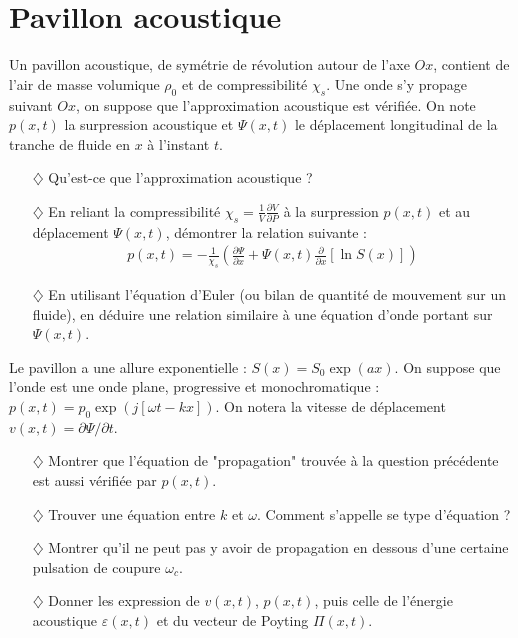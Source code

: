 \documentclass{report}
\begin{document}
\newpage

\section*{Pavillon acoustique}

Un pavillon acoustique, de symétrie de révolution autour de l'axe $Ox$, contient de l'air de masse volumique $\rho_0$ et de compressibilité $\chi_s$. Une onde s'y propage suivant $Ox$, on suppose que l'approximation acoustique est vérifiée. On note $p(x,t)$ la surpression acoustique et $\Psi(x,t)$ le déplacement longitudinal de la tranche de fluide en $x$ à l'instant $t$. 

\begin{itemize}

\item[$\diamondsuit$] Qu'est-ce que l'approximation acoustique ?

\item[$\diamondsuit$] En reliant la compressibilité $\chi_s=\frac{1}{V}\frac{\partial V}{\partial P}$ à la surpression $p(x,t)$ et au déplacement $\Psi(x,t)$, démontrer la relation suivante :
\begin{align*}
	p(x,t) = -\frac{1}{\chi_s}\left(\frac{\partial \Psi}{\partial x}+\Psi(x,t)\frac{\partial }{\partial x}\left[\ln S(x) \right]  \right)
\end{align*}

\item[$\diamondsuit$] En utilisant l'équation d'Euler (ou bilan de quantité de mouvement sur un fluide), en déduire une relation similaire à une équation d'onde portant sur $\Psi(x,t)$.

\end{itemize}

Le pavillon a une allure exponentielle : $S(x)=S_0\exp(ax)$. On suppose que l'onde est une onde plane, progressive et monochromatique : $p(x,t)=p_0\exp\left(j[\omega t-kx] \right)$. On notera la vitesse de déplacement $v(x,t)=\partial\Psi/\partial t$.

\begin{itemize}

\item[$\diamondsuit$] Montrer que l'équation de "propagation" trouvée à la question précédente est aussi vérifiée par $p(x,t)$.

\item[$\diamondsuit$]  Trouver une équation entre $k$ et $\omega$. Comment s'appelle se type d'équation ?

\item[$\diamondsuit$] Montrer qu'il ne peut pas y avoir de propagation en dessous d'une certaine pulsation de coupure $\omega_c$.

\item[$\diamondsuit$] Donner les expression de $v(x,t)$, $p(x,t)$, puis celle de l'énergie acoustique $\varepsilon(x,t)$ et du vecteur de Poyting $\Pi(x,t)$.

\end{itemize}
\end{document}
